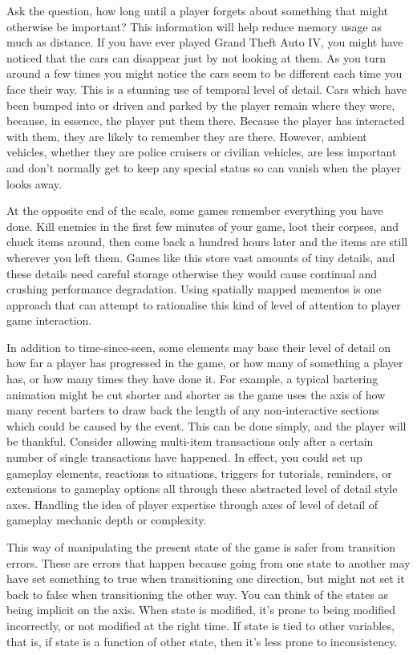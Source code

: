 \documentclass[a4paper,12pt]{article}
\begin{document}
Ask the question, how long until a player forgets about something that might otherwise be important?
This information will help reduce memory usage as much as distance.
If you have ever played Grand Theft Auto IV, you might have noticed that the cars can disappear just by not looking at them.
As you turn around a few times you might notice the cars seem to be different each time you face their way.
This is a stunning use of temporal level of detail.
Cars which have been bumped into or driven and parked by the player remain where they were, because, in essence, the player put them there.
Because the player has interacted with them, they are likely to remember they are there.
However, ambient vehicles, whether they are police cruisers or civilian vehicles, are less important and don't normally get to keep any special status so can vanish when the player looks away.

At the opposite end of the scale, some games remember everything you have done.
Kill enemies in the first few minutes of your game, loot their corpses, and chuck items around, then come back a hundred hours later and the items are still wherever you left them.
Games like this store vast amounts of tiny details, and these details need careful storage otherwise they would cause continual and crushing performance degradation.
Using spatially mapped mementos is one approach that can attempt to rationalise this kind of level of attention to player game interaction.

In addition to time-since-seen, some elements may base their level of detail on how far a player has progressed in the game, or how many of something a player has, or how many times they have done it.
For example, a typical bartering animation might be cut shorter and shorter as the game uses the axis of how many recent barters to draw back the length of any non-interactive sections which could be caused by the event.
This can be done simply, and the player will be thankful.
Consider allowing multi-item transactions only after a certain number of single transactions have happened.
In effect, you could set up gameplay elements, reactions to situations, triggers for tutorials, reminders, or extensions to gameplay options all through these abstracted level of detail style axes.
Handling the idea of player expertise through axes of level of detail of gameplay mechanic depth or complexity.

This way of manipulating the present state of the game is safer from transition errors.
These are errors that happen because going from one state to another may have set something to true when transitioning one direction, but might not set it back to false when transitioning the other way.
You can think of the states as being implicit on the axis.
When state is modified, it's prone to being modified incorrectly, or not modified at the right time.
If state is tied to other variables, that is, if state is a function of other state, then it's less prone to inconsistency.
\end{document}
